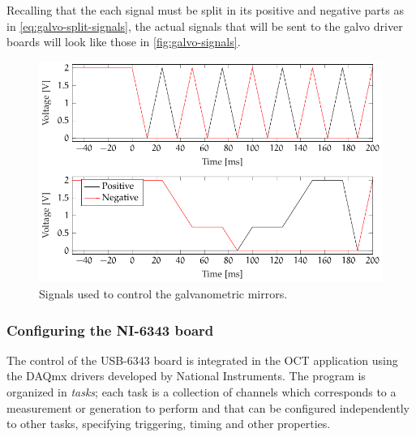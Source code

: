 Recalling that the each signal must be split in its positive and negative parts as in \autoref{eq:galvo-split-signals}, the actual signals that will be sent to the galvo driver boards will look like those in \autoref{fig:galvo-signals}.

\begin{figure}[htb]
	\myfloatalign
	\includegraphics[width=0.9\linewidth]{gfx/ch4/galvo-signals-split}
	\caption{Signals used to control the galvanometric mirrors.}\label{fig:galvo-signals-split}
\end{figure}

\subsubsection*{Configuring the NI-6343 board}
The control of the USB-6343 board is integrated in the OCT application using the DAQmx drivers developed by National Instruments. The program is organized in \emph{tasks}; each task is a collection of channels which corresponds to a measurement or generation to perform and that can be configured independently to other tasks, specifying triggering, timing and other properties. 

